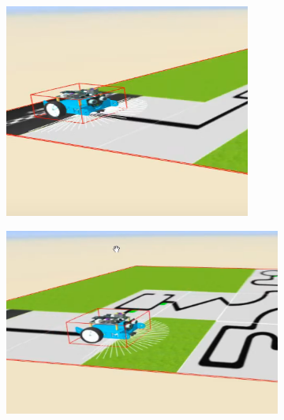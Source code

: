 \begin{figure}[h!]
\begin{subfigure}[b]{0.5\textwidth}
    \includegraphics[width=\textwidth, height=\textwidth]{rampa_ej0.png}
  \end{subfigure}
  \hfill
  \hfill
  \begin{subfigure}[b]{0.5\textwidth}
    \includegraphics[width=\textwidth, height=\textwidth]{rampa_ej.png}

\end{subfigure}
\end{figure}
